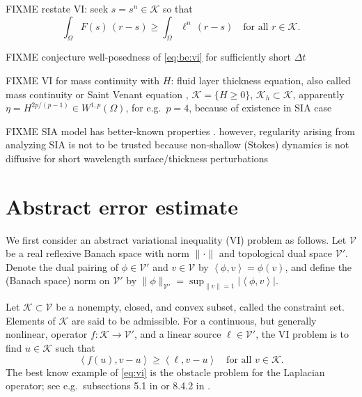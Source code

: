 \documentclass[hidelinks,onefignum,onetabnum,final]{siamart220329}  %
\newcommand{\cK}{\mathcal{K}}
\newcommand{\cV}{\mathcal{V}}
\newcommand{\ip}[2]{\left<#1,#2\right>}
\begin{document}
FIXME restate VI: seek $s = s^n \in \cK$ so that 
\begin{equation}
\int_\Omega F(s)\,(r-s) \ge \int_\Omega \ell^n \,(r-s) \quad \text{for all } r \in \cK. \label{eq:be:vi}
\end{equation}

FIXME conjecture well-posedness of \eqref{eq:be:vi} for sufficiently short $\Delta t$

FIXME VI for mass continuity with $H$: fluid layer thickness equation, also called mass continuity or Saint Venant equation \cite{JouvetBueler2012}, $\cK = \{H\ge 0\}$, $\cK_h \subset \cK$, apparently $\eta = H^{2p/(p-1)} \in W^{1,p}(\Omega)$, for e.g.~$p=4$, because of existence in SIA case \cite{JouvetBueler2012}

FIXME SIA model has better-known properties \cite{JouvetBueler2012,PiersantiTemam2023}. however, regularity arising from analyzing SIA is not to be trusted because non-shallow (Stokes) dynamics is not diffusive for short wavelength surface/thickness perturbations \cite{Pattynetal2008}


\section{Abstract error estimate} \label{sec:abstractestimate}

We first consider an abstract variational inequality (VI) \cite{KinderlehrerStampacchia1980} problem as follows.  Let $\cV$ be a real reflexive Banach space with norm $\|\cdot\|$ and topological dual space $\cV'$.  Denote the dual pairing of $\phi \in \cV'$ and $v\in\cV$ by $\ip{\phi}{v} = \phi(v)$, and define the (Banach space) norm on $\cV'$ by $\|\phi\|_{\cV'} = \sup_{\|v\|=1} |\!\ip{\phi}{v}\!|$.

Let $\cK \subset \cV$ be a nonempty, closed, and convex subset, called the constraint set.  Elements of $\cK$ are said to be admissible.  For a continuous, but generally nonlinear, operator $f:\cK \to \cV'$, and a linear source $\ell\in \cV'$, the VI problem is to find $u\in \cK$ such that
\begin{equation}
\ip{f(u)}{v-u} \ge \ip{\ell}{v-u} \quad \text{for all } v\in \cK. \label{eq:vi}
\end{equation}
The best know example of \eqref{eq:vi} is the obstacle problem for the Laplacian operator; see e.g.~subsections 5.1 in \cite{Ciarlet2002} or 8.4.2 in \cite{Evans2010}.
\end{document}
